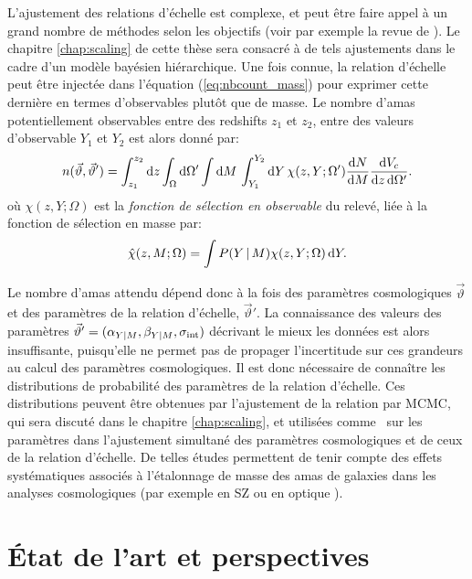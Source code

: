 L'ajustement des relations d'échelle est complexe, et peut être faire appel à un grand nombre de méthodes selon les objectifs (voir par exemple la revue de \cite{andreon_measurement_2013}).
Le chapitre \ref{chap:scaling} de cette thèse sera consacré à de tels ajustements dans le cadre d'un modèle bayésien hiérarchique.
Une fois connue, la relation d'échelle peut être injectée dans l'équation (\ref{eq:nbcount_mass}) pour exprimer cette dernière en termes d'observables plutôt que de masse.
Le nombre d'amas potentiellement observables entre des redshifts $z_1$ et $z_2$, entre des valeurs d'observable $Y_1$ et $Y_2$ est alors donné par:
\begin{equation}
    \label{eq:nbcount_obs}
    n(\vec{\vartheta}, \vec{\vartheta}')
    = \int_{z_1}^{z_2} \mathrm{d} z
      \int_\Omega \mathrm{d}\Omega'
      \int \mathrm{d} M \,
      \int_{Y_1}^{Y_2} \mathrm{d} Y \,
        \chi(z, Y; \Omega') \frac{\mathrm{d} N}{\mathrm{d} M} \frac{\mathrm{d} V_c}{\mathrm{d} z \, \mathrm{d}\Omega'}.
\end{equation}
où $\chi(z, Y; \Omega)$ est la \textit{fonction de sélection en observable} du relevé, liée à la fonction de sélection en masse par:
\begin{equation}
    \label{eq:nbcount_sel}
    \hat{\chi}(z, M ; \Omega) = \int P(Y \,|\, M) \chi(z, Y ; \Omega) \, \mathrm{d} Y.
\end{equation}

Le nombre d'amas attendu dépend donc à la fois des paramètres cosmologiques $\vec{\vartheta}$ et des paramètres de la relation d'échelle, $\vec{\vartheta}'$.
La connaissance des valeurs des paramètres $\vec{\vartheta}' = (\alpha_{Y|M}, \beta_{Y|M}, \sigma_{\rm int})$ décrivant le mieux les données est alors insuffisante, puisqu'elle ne permet pas de propager l'incertitude sur ces grandeurs au calcul des paramètres cosmologiques.
Il est donc nécessaire de connaître les distributions de probabilité des paramètres de la relation d'échelle.
Ces distributions peuvent être obtenues par l'ajustement de la relation par MCMC, qui sera discuté dans le chapitre \ref{chap:scaling}, et utilisées comme \prior\ sur les paramètres dans l'ajustement simultané des paramètres cosmologiques et de ceux de la relation d'échelle.
De telles études permettent de tenir compte des effets systématiques associés à l'étalonnage de masse des amas de galaxies dans les analyses cosmologiques (par exemple en SZ \cite{bocquet_cluster_2019} ou en optique \cite{des_collaboration_dark_2020}).

\section{État de l'art et perspectives}


